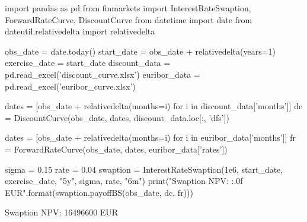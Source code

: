 \cprotEnv\begin{solution}
\begin{ipython}
import pandas as pd
from finmarkets import InterestRateSwaption, ForwardRateCurve, DiscountCurve
from datetime import date
from dateutil.relativedelta import relativedelta

obs_date = date.today()
start_date = obs_date + relativedelta(years=1)
exercise_date = start_date
discount_data = pd.read_excel('discount_curve.xlsx')
euribor_data = pd.read_excel('euribor_curve.xlsx')


dates = [obs_date + relativedelta(months=i) for i in discount_data['months']]
dc = DiscountCurve(obs_date, dates, discount_data.loc[:, 'dfs'])

dates = [obs_date + relativedelta(months=i) for i in euribor_data['months']]
fr = ForwardRateCurve(obs_date, dates, euribor_data['rates'])

sigma = 0.15
rate = 0.04
swaption = InterestRateSwaption(1e6, start_date, exercise_date,
                                "5y", sigma, rate, "6m")
print("Swaption NPV: {:.0f} EUR".format(swaption.payoffBS(obs_date, dc, fr)))
\end{ipython}
\begin{ioutput}
Swaption NPV: 16496600 EUR
\end{ioutput}
\end{solution}

